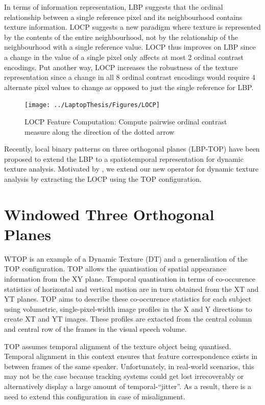 \documentclass[a4paper, 10pt, conference]{ieeeconf}      %
\begin{document}
In terms of information representation, LBP suggests that the ordinal relationship between a single reference pixel and its neighbourhood contains texture information.
LOCP suggests a new paradigm where texture is represented by the contents of the entire neighbourhood, not by the relationship of the neighbourhood with a single reference value. 
LOCP thus improves on LBP since a change in the value of a single pixel only affects at most 2 ordinal contrast encodings.
Put another way, LOCP increases the robustness of the texture representation since a change in all 8 ordinal contrast encodings would require 4 alternate pixel values to change as opposed to just the single reference for LBP.
\begin{figure}[htp!]
\centering
 \texttt{[image: ../LaptopThesis/Figures/LOCP]}
\caption{LOCP Feature Computation: Compute pairwise ordinal contrast measure along the direction of the dotted arrow}
\label{LOCPMatrix}
\end{figure}

Recently, local binary patterns on three orthogonal planes (LBP-TOP) \cite{conf/icpr/ZhaoP06} have been proposed to extend the LBP to a spatiotemporal representation for dynamic texture analysis. 
Motivated by \cite{conf/icpr/ZhaoP06}, we extend our new operator for dynamic texture analysis by extracting the LOCP using the TOP configuration.

\section{Windowed Three Orthogonal Planes}
\label{WTOP}
WTOP is an example of a Dynamic Texture (DT) and a generalisation of the TOP configuration\cite{conf/icpr/ZhaoP06}. 
TOP allows the quantisation of spatial appearance information from the XY plane.
Temporal quantisation in terms of co-occurence statistics of horizontal and vertical motion are in turn obtained from the XT and YT planes. 
TOP aims to describe these co-occurence statistics for each subject using volumetric, single-pixel-width image profiles in the X and Y directions to create XT and YT images. 
These profiles are extacted from the central column and central row of the frames in the visual speech volume.

TOP assumes temporal alignment of the texture object being quantised. 
Temporal alignment in this context ensures that feature correspondence exists in between frames of the same speaker.
Unfortunately, in real-world scenarios, this may not be the case because tracking systems could get lost irrecoverably or alternatively display a large amount of temporal-``jitter''.
As a result, there is a need to extend this configuration in case of misalignment. 
\end{document}
